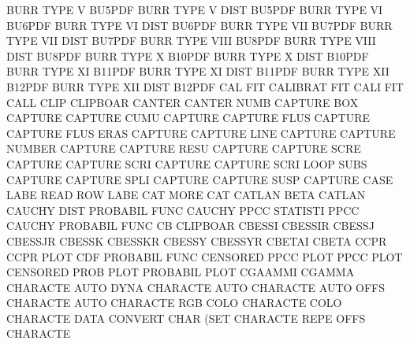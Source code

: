 BURR     TYPE V                         BU5PDF
BURR     TYPE V    DIST                 BU5PDF
BURR     TYPE VI                        BU6PDF
BURR     TYPE VI   DIST                 BU6PDF
BURR     TYPE VII                       BU7PDF
BURR     TYPE VII  DIST                 BU7PDF
BURR     TYPE VIII                      BU8PDF
BURR     TYPE VIII DIST                 BU8PDF
BURR     TYPE X                         B10PDF
BURR     TYPE X    DIST                 B10PDF
BURR     TYPE XI                        B11PDF
BURR     TYPE XI   DIST                 B11PDF
BURR     TYPE XII                       B12PDF
BURR     TYPE XII  DIST                 B12PDF
CAL                                     FIT
CALIBRAT                                FIT
CALI                                    FIT
CALL     CLIP                           CLIPBOAR
CANTER                                  CANTER   NUMB
CAPTURE  BOX                            CAPTURE
CAPTURE  CUMU                           CAPTURE
CAPTURE  FLUS                           CAPTURE
CAPTURE  FLUS ERAS                      CAPTURE
CAPTURE  LINE                           CAPTURE
CAPTURE  NUMBER                         CAPTURE
CAPTURE  RESU                           CAPTURE
CAPTURE  SCRE                           CAPTURE
CAPTURE  SCRI                           CAPTURE
CAPTURE  SCRI LOOP SUBS                 CAPTURE
CAPTURE  SPLI                           CAPTURE
CAPTURE  SUSP                           CAPTURE
CASE     LABE                           READ     ROW  LABE
CAT      MORE                           CAT
CATLAN   BETA                           CATLAN
CAUCHY   DIST                           PROBABIL FUNC
CAUCHY   PPCC                           STATISTI PPCC
CAUCHY                                  PROBABIL FUNC
CB                                      CLIPBOAR
CBESSI                                  CBESSIR
CBESSJ                                  CBESSJR
CBESSK                                  CBESSKR
CBESSY                                  CBESSYR
CBETAI                                  CBETA
CCPR                                    CCPR     PLOT
CDF                                     PROBABIL FUNC
CENSORED PPCC PLOT                      PPCC     PLOT
CENSORED PROB PLOT                      PROBABIL PLOT
CGAAMMI                                 CGAMMA
CHARACTE AUTO DYNA                      CHARACTE AUTO
CHARACTE AUTO OFFS                      CHARACTE AUTO
CHARACTE RGB  COLO                      CHARACTE COLO
CHARACTE DATA                           CONVERT  CHAR (SET
CHARACTE REPE OFFS                      CHARACTE
